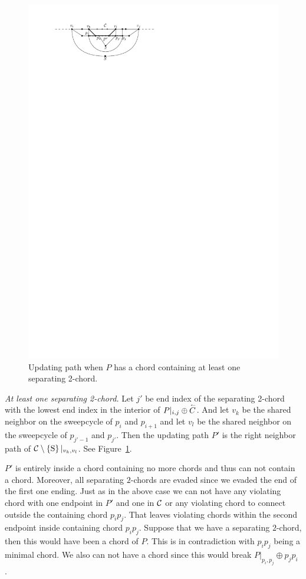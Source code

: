 \begin{figure}[!b]
        \includegraphics[scale=1]{unifiedAlgo/img/sweep/cases/2chordInChordUpdate}
        \caption{Updating path when $P$ has a chord containing at least one separating 2-chord.}
        \label{fig:sweep:2chordInChordUpdate}
      \end{figure}

    \emph{At least one separating 2-chord.}
      Let $j'$ be end index of the separating 2-chord with the lowest end index in the interior of $P|_{i, j} \oplus \accentset{\leftharpoonup}{{C}}$. And let $v_k$ be the shared neighbor on the sweepcycle of $p_{i}$ and $p_{i +1}$ and let $v_l$ be the shared neighbor on the sweepcycle  of $p_{j' -1}$ and $p_{j'}$.
      Then the updating path $P'$ is the right neighbor path of $\mathcal{C} \setminus \left\lbrace {\mathrm{S}} \right\rbrace|_{v_k, v_l}$. See Figure~\ref{fig:sweep:2chordInChordUpdate}.

      $P'$ is entirely inside a chord containing no more chords and thus can not contain a chord. Moreover, all separating $2$-chords are evaded since we evaded the end of the first one ending.  Just as in the above case we can not have any violating chord with one endpoint in $P'$ and one in $\mathcal{C}$ or any violating chord to connect outside the containing chord $p_i p_j$.
      That leaves violating chords within the second endpoint inside containing chord $p_i p_j$. 
      Suppose that we have a separating $2$-chord, then this would have been a chord of $P$. This is in contradiction with $p_i p_j$ being a minimal chord.
      We also can not have a chord since this would break $P|_{p_i, p_j} \oplus p_j p_i$ .

